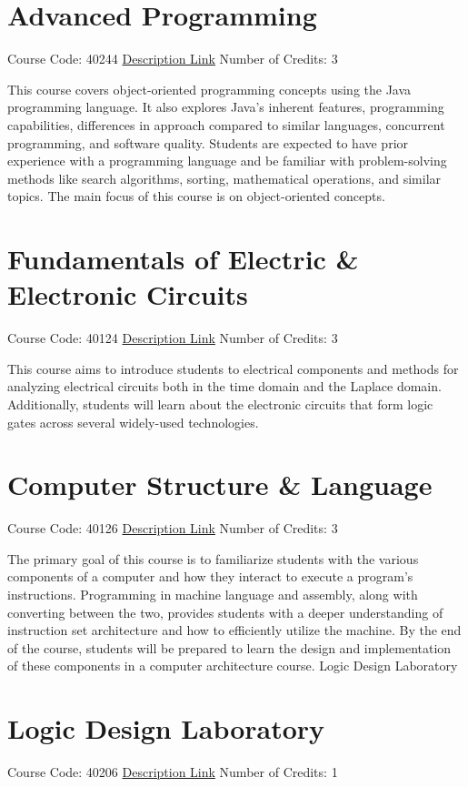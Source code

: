 \section{Advanced Programming}
Course Code: 40244 \qquad \quad \href{https://docs.ce.sharif.edu/course/40244}{Description Link}
\qquad \quad Number of Credits: 3

This course covers object-oriented programming concepts using the Java programming language. It also explores Java's inherent features, programming capabilities, differences in approach compared to similar languages, concurrent programming, and software quality. Students are expected to have prior experience with a programming language and be familiar with problem-solving methods like search algorithms, sorting, mathematical operations, and similar topics. The main focus of this course is on object-oriented concepts.


\section{Fundamentals of Electric \& Electronic Circuits}
Course Code: 40124 \qquad \quad \href{https://docs.ce.sharif.edu/course/40124}{Description Link}
\qquad \quad Number of Credits: 3

This course aims to introduce students to electrical components and methods for analyzing electrical circuits both in the time domain and the Laplace domain. Additionally, students will learn about the electronic circuits that form logic gates across several widely-used technologies.

\section{Computer Structure \& Language}
Course Code: 40126 \qquad \quad \href{https://docs.ce.sharif.edu/course/40126}{Description Link}
\qquad \quad Number of Credits: 3

The primary goal of this course is to familiarize students with the various components of a computer and how they interact to execute a program’s instructions. Programming in machine language and assembly, along with converting between the two, provides students with a deeper understanding of instruction set architecture and how to efficiently utilize the machine. By the end of the course, students will be prepared to learn the design and implementation of these components in a computer architecture course.
Logic Design Laboratory


\section{Logic Design Laboratory}
Course Code: 40206 \qquad \quad \href{https://docs.ce.sharif.edu/course/40206}{Description Link}
\qquad \quad Number of Credits: 1

